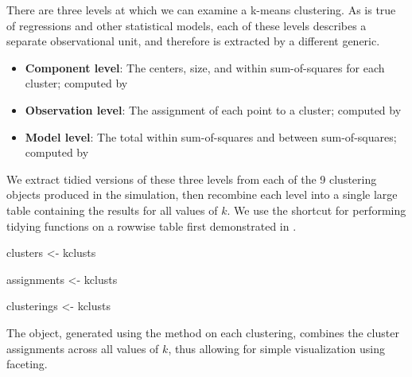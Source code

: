 There are three levels at which we can examine a k-means clustering. As is true of regressions and other statistical models, each of these levels describes a separate observational unit, and therefore is extracted by a different  generic.

\begin{itemize}
\item \textbf{Component level}: The centers, size, and within sum-of-squares for each cluster; computed by 
\item \textbf{Observation level}: The assignment of each point to a cluster; computed by 
\item \textbf{Model level}: The total within sum-of-squares and between sum-of-squares; computed by 
\end{itemize}

We extract tidied versions of these three levels from each of the 9 clustering objects produced in the simulation, then recombine each level into a single large table containing the results for all values of $k$. We use the shortcut for performing tidying functions on a rowwise table first demonstrated in .


\begin{example}
clusters <- kclusts %
\end{example}

\begin{example}
assignments <- kclusts %
\end{example}

\begin{example}
clusterings <- kclusts %
\end{example}


The  object, generated using the  method on each clustering, combines the cluster assignments across all values of $k$, thus allowing for simple visualization using faceting.

